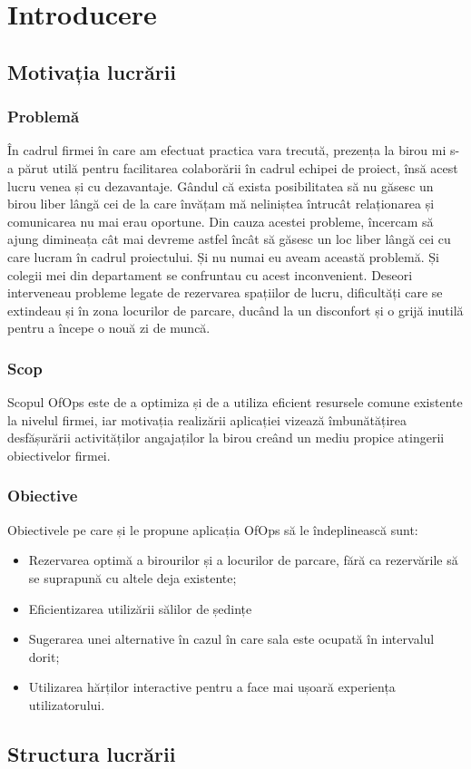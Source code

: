 \chapter{Introducere}

\section{Motivația lucrării}
\subsection{Problemă}
\hspace{1cm}În cadrul firmei în care am efectuat practica vara trecută, prezența la birou mi s-a părut utilă pentru facilitarea colaborării în cadrul echipei de proiect, însă acest lucru venea și cu dezavantaje. Gândul că exista posibilitatea să nu găsesc un birou liber lângă cei de la care învățam mă neliniștea întrucât relaționarea și comunicarea nu mai erau oportune. Din cauza acestei probleme, încercam să ajung dimineața cât mai devreme astfel încât să găsesc un loc liber lângă cei cu care lucram în cadrul proiectului. Și nu numai eu aveam această problemă. Și colegii mei din departament se confruntau cu acest inconvenient. Deseori interveneau probleme legate de rezervarea spațiilor de lucru,  dificultăți care se extindeau și în zona locurilor de parcare, ducând la un disconfort și o grijă inutilă pentru a începe o nouă zi de muncă.

\subsection{Scop}
\hspace{1cm} Scopul OfOps este de a optimiza și de a utiliza  eficient resursele comune existente la nivelul firmei, iar motivația realizării aplicației vizează îmbunătățirea desfășurării activităților angajaților la birou creând un mediu propice atingerii obiectivelor firmei.

\subsection{Obiective}
\hspace{1cm} Obiectivele pe care și le propune aplicația OfOps să le îndeplinească sunt:
    \begin{itemize}
        \item Rezervarea optimă a birourilor și a locurilor de parcare, fără ca rezervările să se suprapună cu altele deja existente;
        \item Eficientizarea utilizării sălilor de ședințe
        \item Sugerarea unei alternative în cazul în care sala este ocupată în intervalul dorit;
        \item Utilizarea hărților interactive pentru a face mai ușoară experiența utilizatorului.
    \end{itemize}


\section{Structura lucrării}

